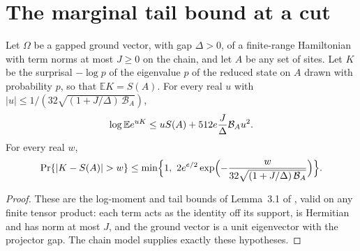 \section{The marginal tail bound at a cut}

\begin{lemma}
    \label{lem:chain_marginal_tail}
    \leanok
    Let $\Omega$ be a gapped ground vector, with gap $\Delta>0$, of a
    finite-range Hamiltonian with term norms at most $J\ge0$ on the chain, and
    let $A$ be any set of sites. Let $K$ be the surprisal $-\log p$ of the
    eigenvalue $p$ of the reduced state on $A$ drawn with probability $p$, so
    that $\mathbb E K=S(A)$. For every real $u$ with
    $|u|\le1/(32\sqrt{(1+J/\Delta)\,\mathcal B_A})$,
    \begin{align}
        \log\mathbb E e^{uK}
        \le uS(A)+512e\frac J\Delta\mathcal B_Au^2.\notag
    \end{align}
    For every real $w$,
    \begin{align}
        \Pr\{|K-S(A)|>w\}\le
        \min\Bigl\{1,\ 2e^{e/2}\exp\Bigl(-\frac{w}{32\sqrt{(1+J/\Delta)\,
                \mathcal B_A}}\Bigr)\Bigr\}.
    \end{align}
    
\end{lemma}
\begin{proof}
    \leanok
    These are the log-moment and tail bounds of Lemma~3.1 of
    \cite{OpenAI2026AreaLaw}, valid on any finite tensor product: each term
    acts as the identity off its support, is
    Hermitian and has norm at most $J$, and the ground vector is a unit
    eigenvector with the projector gap. The chain model supplies exactly these
    hypotheses.
\end{proof}

